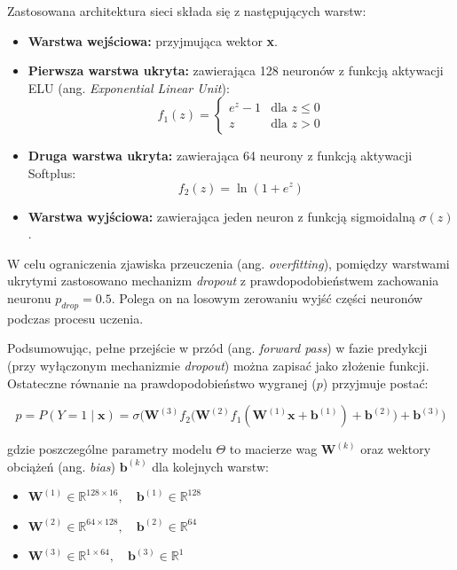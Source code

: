 \documentclass[twoside]{customStyle}
\begin{document}
	Zastosowana architektura sieci składa się z następujących warstw:
	\begin{itemize}
		\item \textbf{Warstwa wejściowa:} przyjmująca wektor \textbf{x}.
		\item \textbf{Pierwsza warstwa ukryta:} zawierająca 128 neuronów z funkcją aktywacji ELU (ang. \textit{Exponential Linear Unit}):
		\begin{equation}
			f_1(z) =
			\begin{cases}
				e^z - 1 & \text{dla } z \le 0 \\
				z & \text{dla } z > 0
			\end{cases}
		\end{equation}
		\item \textbf{Druga warstwa ukryta:} zawierająca 64 neurony z funkcją aktywacji Softplus:
		\begin{equation}
			f_2(z) = \ln(1 + e^z)
		\end{equation}
		\item \textbf{Warstwa wyjściowa:} zawierająca jeden neuron z funkcją sigmoidalną $\sigma(z)$.
	\end{itemize}
	
	W celu ograniczenia zjawiska przeuczenia (ang. \textit{overfitting}), pomiędzy warstwami ukrytymi zastosowano mechanizm \textit{dropout} z prawdopodobieństwem zachowania neuronu $p_{drop}=0.5$. Polega on na losowym zerowaniu wyjść części neuronów podczas procesu uczenia.
	
	Podsumowując, pełne przejście w przód (ang. \textit{forward pass}) w fazie predykcji (przy wyłączonym mechanizmie \textit{dropout}) można zapisać jako złożenie funkcji. Ostateczne równanie na prawdopodobieństwo wygranej ($p$) przyjmuje postać:
	
	\begin{equation}
		p = P(Y=1 \mid \mathbf{x}) = \sigma \Big( \mathbf{W}^{(3)} f_2 \big( \mathbf{W}^{(2)} f_1 (\mathbf{W}^{(1)} \mathbf{x} + \mathbf{b}^{(1)}) + \mathbf{b}^{(2)} \big) + \mathbf{b}^{(3)} \Big)
	\end{equation}

\newpage
	gdzie poszczególne parametry modelu $\Theta$ to macierze wag $\mathbf{W}^{(k)}$ oraz wektory obciążeń (ang. \textit{bias}) $\mathbf{b}^{(k)}$ dla kolejnych warstw:
	\begin{itemize}
		\item $\mathbf{W}^{(1)} \in \mathbb{R}^{128 \times 16}, \quad \mathbf{b}^{(1)} \in \mathbb{R}^{128}$
		\item $\mathbf{W}^{(2)} \in \mathbb{R}^{64 \times 128}, \quad \mathbf{b}^{(2)} \in \mathbb{R}^{64}$
		\item $\mathbf{W}^{(3)} \in \mathbb{R}^{1 \times 64}, \quad \mathbf{b}^{(3)} \in \mathbb{R}^1$
	\end{itemize}
\end{document}
